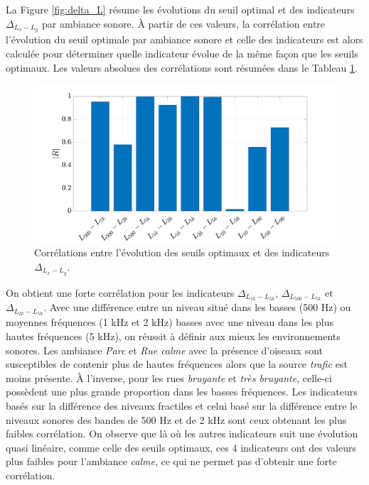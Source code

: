 La Figure \ref{fig:delta_L} résume les évolutions du seuil optimal et des indicateurs $\Delta_{L_x-L_y}$ par ambiance sonore. \`A partir de ces valeurs, la corrélation entre l'évolution du seuil optimale par ambiance sonore et celle des indicateurs est alors calculée pour déterminer quelle indicateur évolue de la même façon que les seuils optimaux. Les valeurs absolues des corrélations sont résumées dans le Tableau \ref{fig:correlation}.

\begin{figure}[h]
\centering
\includegraphics[width=0.9\linewidth]{./figures/resultats/Opt_correlation.pdf}
\caption{Corrélations entre l'évolution des seuils optimaux et des indicateurs $\Delta_{L_x-L_y}$.}
\label{fig:correlation}
\end{figure}

On obtient une forte corrélation pour les indicateurs $\Delta_{L_{1k}-L_{5k}}$, $\Delta_{L_{500}-L_{5k}}$ et $\Delta_{L_{2k}-L_{5k}}$. Avec une différence entre un niveau situé dans les basses (500 Hz) ou moyennes fréquences (1 kHz et 2 kHz) basses avec une niveau dans les plus hautes fréquences (5 kHz), on réussit à définir aux mieux les environnements sonores. Les ambiance \textit{Parc} et \textit{Rue calme} avec la présence d'oiseaux sont susceptibles de contenir plus de hautes fréquences alors que la source \textit{trafic} est moins présente. À l'inverse, pour les rues \textit{bruyante} et \textit{très bruyante}, celle-ci possèdent une plus grande proportion dans les basses fréquences. 
Les indicateurs basés sur la différence des niveaux fractiles et celui basé sur la différence entre le niveaux sonores des bandes de 500 Hz et de 2 kHz sont ceux obtenant les plus faibles corrélation. On observe que là où les autres indicateurs suit une évolution quasi linéaire, comme celle des seuils optimaux, ces 4 indicateurs ont des valeurs plus faibles pour l'ambiance \textit{calme}, ce qui ne permet pas d'obtenir une forte corrélation.

